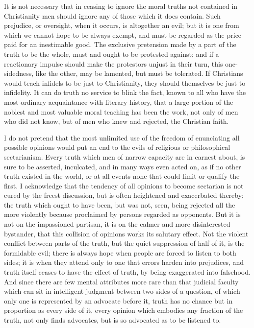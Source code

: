 \documentclass[11pt,openany]{book}
\begin{document}
It is not necessary that in ceasing to ignore the moral truths not contained in Christianity men should ignore any of those which it does contain. Such prejudice, or oversight, when it occurs, is altogether an evil; but it is one from which we cannot hope to be always exempt, and must be regarded as the price paid for an inestimable good. The exclusive pretension made by a part of the truth to be the whole, must and ought to be protested against; and if a reactionary impulse should make the protestors unjust in their turn, this one-sidedness, like the other, may be lamented, but must be tolerated. If Christians would teach infidels to be just to Christianity, they should themselves be just to infidelity. It can do truth no service to blink the fact, known to all who have the most ordinary acquaintance with literary history, that a large portion of the noblest and most valuable moral teaching has been the work, not only of men who did not know, but of men who knew and rejected, the Christian faith.

I do not pretend that the most unlimited use of the freedom of enunciating all possible opinions would put an end to the evils of religious or philosophical sectarianism. Every truth which men of narrow capacity are in earnest about, is sure to be asserted, inculcated, and in many ways even acted on, as if no other truth existed in the world, or at all events none that could limit or qualify the first. I acknowledge that the tendency of all opinions to become sectarian is not cured by the freest discussion, but is often heightened and exacerbated thereby; the truth which ought to have been, but was not, seen, being rejected all the more violently because proclaimed by persons regarded as opponents. But it is not on the impassioned partisan, it is on the calmer and more disinterested bystander, that this collision of opinions works its salutary effect. Not the violent conflict between parts of the truth, but the quiet suppression of half of it, is the formidable evil; there is always hope when people are forced to listen to both sides; it is when they attend only to one that errors harden into prejudices, and truth itself ceases to have the effect of truth, by being exaggerated into falsehood. And since there are few mental attributes more rare than that judicial faculty which can sit in intelligent judgment between two sides of a question, of which only one is represented by an advocate before it, truth has no chance but in proportion as every side of it, every opinion which embodies any fraction of the truth, not only finds advocates, but is so advocated as to be listened to.
\end{document}
